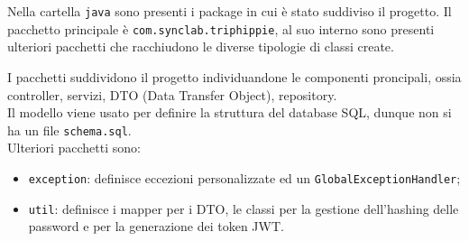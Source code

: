 \noindent
Nella cartella \texttt{java} sono presenti i package in cui è stato suddiviso il progetto.
Il pacchetto principale è \texttt{com.synclab.triphippie}, al suo interno sono presenti ulteriori pacchetti che racchiudono le diverse tipologie di classi create.
\begin{figure}[h]
    \centering
    \begin{minipage}{7cm}
    \end{minipage}
\end{figure}

\noindent
I pacchetti suddividono il progetto individuandone le componenti proncipali, ossia controller, servizi, DTO (Data Transfer Object), repository.\\
Il modello viene usato per definire la struttura del database SQL, dunque non si ha un file \texttt{schema.sql}.\\
Ulteriori pacchetti sono:
\begin{itemize}
    \item \texttt{exception}: definisce eccezioni personalizzate ed un \texttt{GlobalExceptionHandler};
    \item \texttt{util}: definisce i mapper per i DTO, le classi per la gestione dell'hashing delle password e per la generazione dei token JWT.
\end{itemize}
